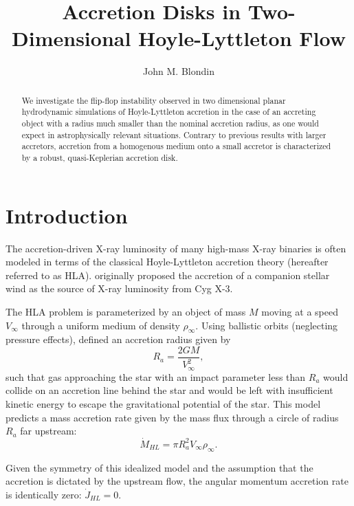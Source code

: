\documentclass{emulateapj}
\begin{document}
 
\title{Accretion Disks in Two-Dimensional Hoyle-Lyttleton Flow}

\author{John M. Blondin}

\begin{abstract}

We investigate the flip-flop instability observed in two dimensional planar hydrodynamic simulations 
of Hoyle-Lyttleton accretion in the case of an accreting object with a radius much smaller
than the nominal accretion radius, as one would expect in astrophysically relevant situations.
Contrary to previous results with larger accretors, accretion from a homogenous
medium onto a small accretor is characterized by a robust, quasi-Keplerian accretion disk. 

\end{abstract}



\section{Introduction}

The accretion-driven X-ray luminosity of many high-mass X-ray binaries is often modeled in terms of the classical
Hoyle-Lyttleton accretion theory (hereafter referred to as HLA). 
\cite{do73} originally proposed the accretion of a companion stellar wind as the source of X-ray luminosity from Cyg X-3.

The HLA problem is parameterized by an object of mass $M$ moving at a speed $V_\infty$ through a uniform 
medium of density $\rho_\infty$.  Using ballistic orbits (neglecting pressure effects), \cite{hl39a} defined an accretion radius given by
\begin{equation}
R_a=\frac{2GM}{V_\infty^2},
\end{equation}
such that gas approaching the star with an impact parameter less than $R_a$ would collide on an accretion line 
behind the star and would be left with insufficient kinetic energy to escape the gravitational potential of the star.  
This model predicts a mass accretion rate given by the mass flux through a circle of radius $R_a$ far upstream:
\begin{equation}
\dot M_{HL} = \pi R_a^2 V_\infty \rho_\infty.
\label{eqn:mdot}
\end{equation}

Given the symmetry of this idealized model and the assumption that the accretion is dictated by the upstream flow,
the angular momentum accretion rate is identically zero: $\dot J_{HL}= 0$.
\end{document}
